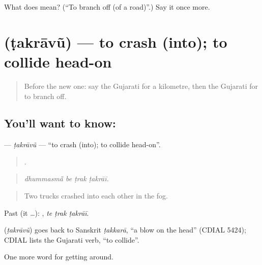 \begin{tcolorbox}[breakable,colback=teal!4,colframe=teal!35!black,title={Before you move on}]
What does  mean? (\textquotedblleft{}To branch off (of a road)\textquotedblright{}.) Say it once more.
\end{tcolorbox}
\section[\texorpdfstring{\gu{ટકરાવું} (ṭakrāvũ)}{ટકરાવું (ṭakrāvũ)}]{ (ṭakrāvũ) — to crash (into); to collide head-on}

\label{lesson:GU-C403-takravu}



\begin{quote}
Before the new one: say the Gujarati for a kilometre, then the Gujarati for to branch off.
\end{quote}

\subsection*{You'll want to know: }
\textbf{} — \emph{ṭakrāvũ} — \textquotedblleft{}to crash (into); to collide head-on\textquotedblright{}.

\begin{quote}
   .
\end{quote}

\begin{quote}
\emph{dhummasmā̃ be ṭrak ṭakrāī.}
\end{quote}

\begin{quote}
Two trucks crashed into each other in the fog.
\end{quote}

Past (it …):   , \emph{te ṭrak ṭakrāī}.

\begin{cousinweb}
\textbf{} (\emph{ṭakrāvũ}) goes back to Sanskrit \emph{ṭakkarā}, \textquotedblleft{}a blow on the head\textquotedblright{} (CDIAL 5424); CDIAL lists the Gujarati verb, \textquotedblleft{}to collide\textquotedblright{}.
\end{cousinweb}

\begin{grammarlens}[title={What you've built}]
One more word for getting around.
\end{grammarlens}

